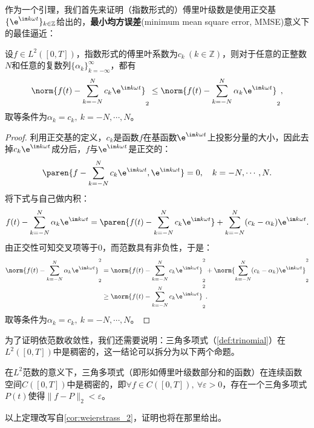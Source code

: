 作为一个引理，我们首先来证明（指数形式的）傅里叶级数是使用正交基$\{\e^{\im k\omega t}\}_{k\in\mathbb{Z}}$给出的，\textbf{最小均方误差}(minimum mean square error, MMSE)意义下的最佳逼近：
\begin{lemma}
    设$f\in L^2([0,T])$，指数形式的傅里叶系数为$c_k\ (k\in\mathbb{Z})$，则对于任意的正整数$N$和任意的复数列$\{\alpha_k\}_{k=-\infty}^{\infty}$，都有
    \begin{equation}
        \norm{f(t)-\sum_{k=-N}^{N}c_k \e^{\im k\omega t}}_2\leq\norm{f(t)-\sum_{k=-N}^{N}\alpha_k \e^{\im k\omega t}}_2,
    \end{equation}
    取等条件为$\alpha_k=c_k,\ k=-N,\cdots,N$。
\end{lemma}
\begin{proof}
    利用正交基的定义，$c_k$是函数$f$在基函数$\e^{\im k\omega t}$上投影分量的大小，因此去掉$c_k\e^{\im k\omega t}$成分后，$f$与$\e^{\im k\omega t}$是正交的：
    \begin{equation}
        \paren{f-\sum_{k=-N}^{N}c_k \e^{\im k\omega t},\e^{\im k\omega t}}=0,\quad k=-N,\cdots,N.
    \end{equation}
    将下式与自己做内积：
    \begin{equation}
        f(t)-\sum_{k=-N}^{N}\alpha_k \e^{\im k\omega t}=\paren{f(t)-\sum_{k=-N}^{N}c_k \e^{\im k\omega t}}+\sum_{k=-N}^{N}(c_k-\alpha_k) \e^{\im k\omega t}.
    \end{equation}
    由正交性可知交叉项等于0，而范数具有非负性，于是：
    \begin{align}
        \norm{f(t)-\sum_{k=-N}^{N}\alpha_k \e^{\im k\omega t}}_2^2&=\norm{f(t)-\sum_{k=-N}^{N}c_k \e^{\im k\omega t}}_2^2+\norm{\sum_{k=-N}^{N}(c_k-\alpha_k) \e^{\im k\omega t}}_2^2\nonumber\\
        &\geq \norm{f(t)-\sum_{k=-N}^{N}c_k \e^{\im k\omega t}}_2^2.
    \end{align}
    取等条件为$\alpha_k=c_k,\ k=-N,\cdots,N$。
\end{proof}

为了证明依范数收敛性，我们还需要说明：三角多项式（\cref{def:trinomial}）在$L^2([0,T])$中是稠密的，这一结论可以拆分为以下两个命题。
\begin{theorem}[Weierstrass第二逼近定理]
    在$L^2$范数的意义下，三角多项式（即形如傅里叶级数部分和的函数）在连续函数空间$C([0,T])$中是稠密的，即$\forall f\in C([0,T]),\ \forall \varepsilon >0$，存在一个三角多项式$P(t)$使得$\|f-P\|_2<\varepsilon$。
\end{theorem}
以上定理改写自\cref{cor:weierstrass_2}，证明也将在那里给出。

